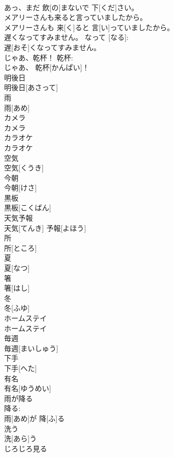 \documentclass[8pt]{extreport}
\begin{document}
\begin{CJK}{UTF8}{min}
\\	あっ、まだ 飲[の]まないで 下[くだ]さい。		
\\	メアリーさんも来ると言っていましたから。	
\\	メアリーさんも 来[く]ると 言[い]っていましたから。	
\\	遅くなってすみません。	なって [なる]: 
\\	遅[おそ]くなってすみません。	
\\	じゃあ、乾杯！	乾杯: 
\\	じゃあ、 乾杯[かんぱい]！		
\\	明後日	
\\	明後日[あさって]		
\\	雨	
\\	雨[あめ]		
\\	カメラ	
\\	カメラ		
\\	カラオケ	
\\	カラオケ		
\\	空気	
\\	空気[くうき]		
\\	今朝	
\\	今朝[けさ]		
\\	黒板	
\\	黒板[こくばん]		
\\	天気予報	
\\	天気[てんき] 予報[よほう]		
\\	所	
\\	所[ところ]		
\\	夏	
\\	夏[なつ]		
\\	箸	
\\	箸[はし]		
\\	冬	
\\	冬[ふゆ]		
\\	ホームステイ	
\\	ホームステイ		
\\	毎週	
\\	毎週[まいしゅう]		
\\	下手	
\\	下手[へた]		
\\	有名	
\\	有名[ゆうめい]		
\\	雨が降る	
\\	降る: 
\\	雨[あめ]が 降[ふ]る		
\\	洗う	
\\	洗[あら]う		
\\	じろじろ見る	

\end{CJK}
\end{document}
